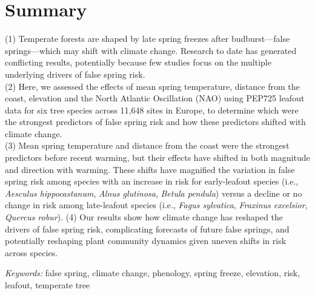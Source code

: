 \documentclass{article}\usepackage[]{graphicx}\usepackage[]{color}
\begin{document}
\renewcommand{\thetable}{\arabic{table}}
\renewcommand{\thefigure}{\arabic{figure}}
\renewcommand{\labelitemi}{$-$}




\section*{Summary} %
(1) Temperate forests are shaped by late spring freezes after budburst---false springs---which may shift with climate change. Research to date has generated conflicting results, potentially because few studies focus on the multiple underlying drivers of false spring risk.  \\
(2) Here, we assessed the effects of mean spring temperature, distance from the coast, elevation and the North Atlantic Oscillation (NAO) using PEP725 leafout data for six tree species across 11,648 sites in Europe, to determine which were the strongest predictors of false spring risk and how these predictors shifted with climate change. \\
(3) Mean spring temperature and distance from the coast were the strongest predictors before recent warming, but their effects have shifted in both magnitude and direction with warming. These shifts have magnified the variation in false spring risk among species with an increase in risk for early-leafout species (i.e., \textit{Aesculus hippocastanum}, \textit{Alnus glutinosa}, \textit{Betula pendula}) versus a decline or no change in risk among late-leafout species (i.e., \textit{Fagus sylvatica}, \textit{Fraxinus excelsior}, \textit{Quercus robur}).
(4) Our results show how climate change has reshaped the drivers of false spring risk, complicating forecasts of future false springs, and potentially reshaping plant community dynamics given uneven shifts in risk across species. 

\vspace{2ex}
\textit{Keywords:} false spring, climate change, phenology, spring freeze, elevation, risk, leafout, temperate tree %
\end{document}
